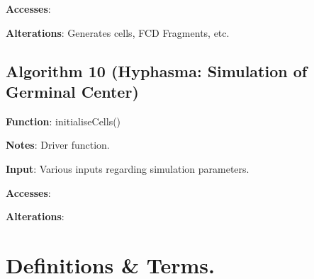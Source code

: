 \documentclass[english]{article}
\begin{document}
\textbf{Accesses}:

\textbf{Alterations}: Generates cells, FCD Fragments, etc. 


\subsection{Algorithm 10 (Hyphasma: Simulation of Germinal Center)}
	
\textbf{Function}: initialiseCells()

\textbf{Notes}: Driver function.

\textbf{Input}: Various inputs regarding simulation parameters. 

\textbf{Accesses}:

\textbf{Alterations}:

	
\section{Definitions \& Terms.}
\end{document}
